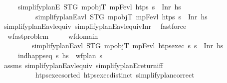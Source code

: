 \begin{isabellebody}
\ \ \ \ \ {\isachardoublequoteopen}simplify{\isacharunderscore}{\kern0pt}planE\ STG\ mp{\isacharunderscore}{\kern0pt}objT\ mp{\isacharunderscore}{\kern0pt}Fevl\ htps\ {\isasympi}s\ {\isacharequal}{\kern0pt}\ Inr\ hs\ \isanewline
\ \ \ \ \ \ \ \ \ {\isasymlongleftrightarrow}\ simplify{\isacharunderscore}{\kern0pt}planE{\isacharunderscore}{\kern0pt}avl\ STG\ mp{\isacharunderscore}{\kern0pt}objT\ mp{\isacharunderscore}{\kern0pt}Fevl\ htps\ {\isasympi}s\ {\isacharequal}{\kern0pt}\ Inr\ hs{\isachardoublequoteclose}\isanewline
%
\isadelimproof
\ \ \ \ %
\endisadelimproof
%
\isatagproof
{}\isamarkupfalse%
\ simplify{\isacharunderscore}{\kern0pt}planE{\isacharunderscore}{\kern0pt}avl{\isacharprime}{\kern0pt}{\isacharunderscore}{\kern0pt}equiv\ simplify{\isacharunderscore}{\kern0pt}planE{\isacharunderscore}{\kern0pt}avl{\isacharunderscore}{\kern0pt}equiv{\isacharunderscore}{\kern0pt}Inr\ \isamarkupfalse%
\ fastforce%
\endisatagproof
{\isafoldproof}%
%
\isadelimproof
\isanewline
%
\endisadelimproof
\isanewline
\ \ \isanewline
\ \ \isamarkupfalse%
\ {\isacharparenleft}{\kern0pt}\ wf{\isacharunderscore}{\kern0pt}ast{\isacharunderscore}{\kern0pt}problem{\isacharparenright}{\kern0pt}\isanewline
\ \ \ \ \ {\isachardoublequoteopen}wf{\isacharunderscore}{\kern0pt}domain{\isachardoublequoteclose}\isanewline
\ \ \ \ \ \ \ \ \ {\isachardoublequoteopen}simplify{\isacharunderscore}{\kern0pt}planE{\isacharunderscore}{\kern0pt}avl\ STG\ mp{\isacharunderscore}{\kern0pt}objT\ mp{\isacharunderscore}{\kern0pt}Fevl\ {\isacharparenleft}{\kern0pt}htps{\isacharunderscore}{\kern0pt}exec\ {\isasympi}s{\isacharparenright}{\kern0pt}\ {\isasympi}s\ {\isacharequal}{\kern0pt}\ Inr\ hs\ {\isachardoublequoteclose}\isanewline
\ \ \ \ \ {\isachardoublequoteopen}ind{\isacharunderscore}{\kern0pt}happ{\isacharunderscore}{\kern0pt}seq\ {\isasympi}s\ hs{\isachardoublequoteclose}\ \ {\isachardoublequoteopen}wf{\isacharunderscore}{\kern0pt}plan\ {\isasympi}s{\isachardoublequoteclose}\isanewline
%
\isadelimproof
\ \ \ \ %
\endisadelimproof
%
\isatagproof
{}\isamarkupfalse%
\ assms\ simplify{\isacharunderscore}{\kern0pt}planE{\isacharunderscore}{\kern0pt}avl{\isacharunderscore}{\kern0pt}equiv\ simplify{\isacharunderscore}{\kern0pt}planE{\isacharunderscore}{\kern0pt}return{\isacharunderscore}{\kern0pt}iff\ \isanewline
\ \ \ \ \ \ \ \ \ \ htps{\isacharunderscore}{\kern0pt}exec{\isacharunderscore}{\kern0pt}sorted\ htps{\isacharunderscore}{\kern0pt}exec{\isacharunderscore}{\kern0pt}distinct\ simplify{\isacharunderscore}{\kern0pt}plan{\isacharunderscore}{\kern0pt}correct\isanewline

\end{isabellebody}

